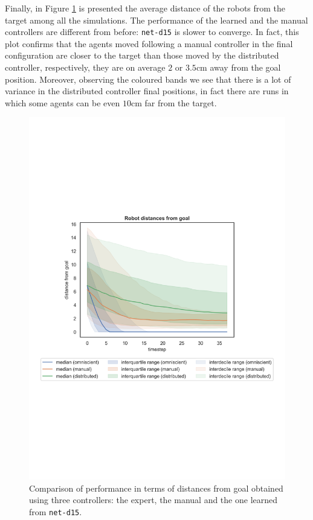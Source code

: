 Finally, in Figure \ref{fig:net-d15distance} is presented the average distance of 
the robots from the target among all the simulations. The performance of the 
learned and the manual controllers are different from before: \texttt{net-d15} is 
slower to converge. In fact, this plot 
confirms that the agents moved following a manual controller in the final 
configuration are closer to the target than those moved by the distributed 
controller, respectively, they are on average $2$ or $3.5$\gls{cm} away from the 
goal position. Moreover, observing the coloured bands we see that there is a lot of 
variance in the distributed controller final positions, in fact there are runs in which 
some agents can be even $10$\gls{cm} far from the target.
\begin{figure}[!htb]
	\centering
	\includegraphics[width=.65\textwidth]{contents/images/net-d15/distances-from-goal-compressed-distributed}%
	\caption[Evaluation of \texttt{net-d15} distances from goal.]{Comparison 
	of performance in terms of distances from goal obtained using three 
	controllers: the expert, the manual and the one learned from \texttt{net-d15}.}
	\label{fig:net-d15distance}
\end{figure}

